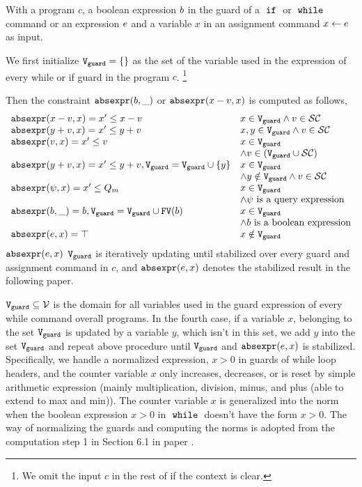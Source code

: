\begin{defn}
 \label{def:constraint_compute}
 With a program $c$, a boolean expression $b$ in the guard of a $\;\mathtt{if}\;$ or $\;\mathtt{while}\;$ command
 or an expression $e$ and a variable $x$
 in an assignment command $\mathrel{ x \leftarrow e }$ as input.

 We first initialize 
 $\mathtt{V}_{\mathtt{guard}} = \{\}$ as the set of the variable used in the expression of every while or if guard in the program $c$.
 \footnote{We omit the input $c$ in the rest of  if the context is clear. }

 Then the constraint $\mathtt{abs}{\mathtt{expr}}(b, \_)$ or $\mathtt{abs}{\mathtt{expr}}(x - v, x)$ is computed as follows,
 \[
 \begin{array}{ll} 
 \mathtt{abs}{\mathtt{expr}}(x - v, x) = x' \leq x - v & x \in \mathtt{V}_{\mathtt{guard}} \land v \in \mathcal{SC} \\
 \mathtt{abs}{\mathtt{expr}}(y + v, x) = x' \leq y + v & x, y \in \mathtt{V}_{\mathtt{guard}} \land v \in \mathcal{SC} \\
 \mathtt{abs}{\mathtt{expr}}(v, x) = x' \leq v 
 & x \in \mathtt{V}_{\mathtt{guard}} \\
 & \land v \in (\mathtt{V}_{\mathtt{guard}} \cup \mathcal{SC}) \\
 \mathtt{abs}{\mathtt{expr}}(y + v, x) = x' \leq y + v, 
 \mathtt{V}_{\mathtt{guard}} = \mathtt{V}_{\mathtt{guard}} \cup \{y\} 
 & x \in \mathtt{V}_{\mathtt{guard}} \\
 & \land y \notin \mathtt{V}_{\mathtt{guard}} \land v \in \mathcal{SC} \\
 \mathtt{abs}{\mathtt{expr}}(\psi, x) = x' \leq Q_m 
 & x \in \mathtt{V}_{\mathtt{guard}} \\
 & \land \psi \text{ is a query expression} \\
 \mathtt{abs}{\mathtt{expr}}(b, \_) = b, \mathtt{V}_{\mathtt{guard}} = \mathtt{V}_{\mathtt{guard}} \cup 
 \mathtt{FV}(b) 
 & x \in \mathtt{V}_{\mathtt{guard}} \\
 & \land b \text{ is a boolean expression} \\
 \mathtt{abs}{\mathtt{expr}}(e, x) = \top & x \notin \mathtt{V}_{\mathtt{guard}} \\
 \end{array}
 \]
 $\mathtt{abs}{\mathtt{expr}}(e, x)$ $\mathtt{V}_{\mathtt{guard}}$ is iteratively updating until stabilized over every guard and assignment command in $c$, and $\mathtt{abs}{\mathtt{expr}}(e, x)$
 denotes the stabilized result in the following paper.
 \end{defn}
%
$\mathtt{V}_{\mathtt{guard}} \subseteq \mathcal{V}$ is the domain for all variables used in the guard expression of every while command overall programs. 
In the fourth case, if a variable $x$, belonging to the set 
$\mathtt{V}_{\mathtt{guard}}$ is updated by a variable $y$, which isn't in this set, 
we add $y$ into the set $\mathtt{V}_{\mathtt{guard}}$ and repeat 
above procedure until $\mathtt{V}_{\mathtt{guard}}$ and $\mathtt{abs}{\mathtt{expr}}(e, x)$ is stabilized. 
Specifically,
we handle a normalized expression, $x > 0$
in guards of while loop headers, and 
the counter variable $x$ only increases, decreases, or is reset by 
simple arithmetic expression (mainly multiplication, division, minus, and plus (able to extend to max and min)). 
The counter variable $x$ is generalized into the norm when the boolean expression $x > 0$
in $\;\mathtt{while}\;$ doesn't have the form $x > 0$.
The way of normalizing the guards and computing the norms is adopted from the computation step 1 in Section 6.1 in paper \cite{SinnZV17}. 

